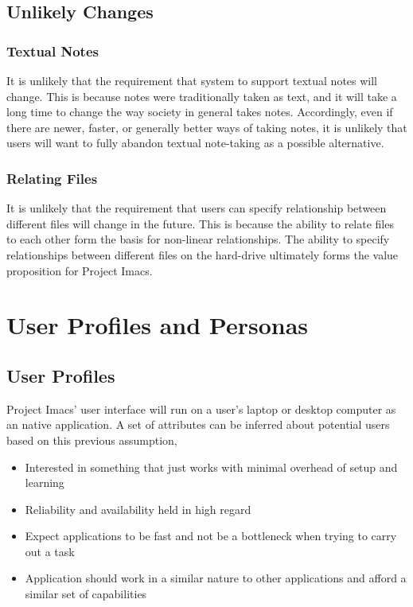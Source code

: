 \documentclass{article}
\begin{document}
\subsection{Unlikely Changes}
\subsubsection{Textual Notes}
It is unlikely that the requirement that system to support textual notes will change. This is because notes were traditionally taken as text, and it will take a long time to change the way society in general takes notes. Accordingly, even if there are newer, faster, or generally better ways of taking notes, it is unlikely that users will want to fully abandon textual note-taking as a possible alternative.

\subsubsection{Relating Files}
It is unlikely that the requirement that users can specify relationship between different files will change in the future. This is because the ability to relate files to each other form the basis for non-linear relationships. The ability to specify relationships between different files on the hard-drive ultimately forms the value proposition for Project Imacs.

\section{User Profiles and Personas}
\subsection{User Profiles}
Project Imacs' user interface will run on a user's laptop or desktop computer as an
native application. A set of attributes can be inferred about potential users based on
this previous assumption,

\begin{itemize}
\item Interested in something that just works with minimal overhead of setup and
learning
\item Reliability and availability held in high regard
\item Expect applications to be fast and not be a bottleneck when trying to carry out
a task
\item Application should work in a similar nature to other applications and
afford a similar set of capabilities
\end{itemize}
\end{document}
